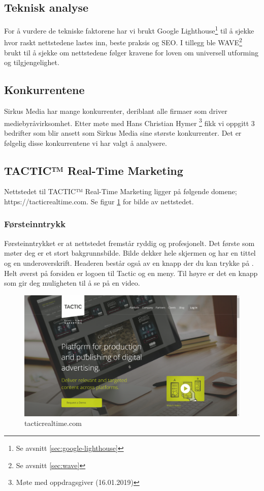 \subsection{Teknisk analyse}
For å vurdere de tekniske faktorene har vi brukt Google Lighthouse\footnote{Se avsnitt \ref{sec:google-lighthouse}} til å sjekke hvor raskt nettstedene lastes inn, beste praksis og SEO. I tillegg ble WAVE\footnote{Se avsnitt \ref{sec:wave}} brukt til å sjekke om nettstedene følger kravene for loven om universell utforming og tilgjengelighet.

\subsection{Konkurrentene}
Sirkus Media har mange konkurrenter, deriblant alle firmaer som driver mediebyråvirksomhet. Etter møte med Hans Christian Hymer \footnote{Møte med oppdragsgiver (16.01.2019)} fikk vi oppgitt 3 bedrifter som blir ansett som Sirkus Media sine største konkurrenter. Det er følgelig disse konkurrentene vi har valgt å analysere.

\subsection{TACTIC™ Real-Time Marketing}
Nettstedet til TACTIC™ Real-Time Marketing ligger på følgende domene; https://tacticrealtime.com. Se figur \ref{fig:competitors-tacticrealtime.com} for bilde av nettstedet.

\subsubsection{Førsteinntrykk}
Førsteinntrykket er at nettstedet fremstår ryddig og profesjonelt. Det første som møter deg er et stort bakgrunnsbilde. Bilde dekker hele skjermen og har en tittel og en underoverskrift. Headeren består også av en knapp der du kan trykke på . Helt øverst på forsiden er logoen til Tactic og en meny. Til høyre er det en knapp som gir deg muligheten til å se på en video. 

\begin{figure}[H]
    \centering
    \includegraphics[width=\textwidth]{line/tacticrealtime_com_(1366x768).png}
    \caption{tacticrealtime.com}
    \label{fig:competitors-tacticrealtime.com}
\end{figure}


